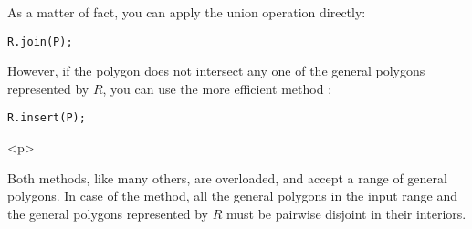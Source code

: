 As a matter of fact, you can apply the union operation directly:

\begin{alltt}
R.join(P);
\end{alltt}

However, if the polygon does not intersect any one of the general
polygons represented by $R$, you can use the more efficient method
:

\begin{alltt}
R.insert(P);
\end{alltt}

\begin{ccHtmlOnly}<p>\end{ccHtmlOnly}
Both methods, like many others, are overloaded, and accept a range of
general polygons. In case of the  method, all the general
polygons in the input range and the general polygons represented by
$R$ must be pairwise disjoint in their interiors.

